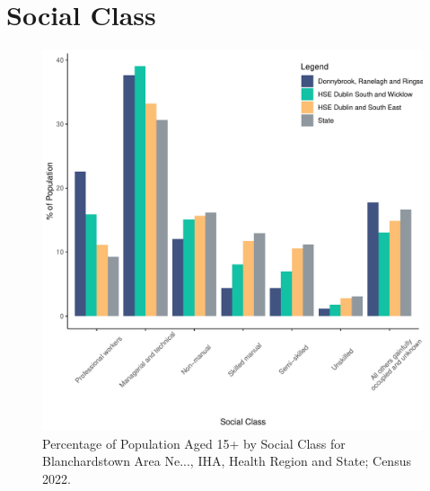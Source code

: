 \documentclass{article}
\begin{document}
\section{Social Class}\label{sect:SC}
\begin{figure}[H]
	\centering
	\includegraphics[width = 140mm]{../figures/SocialClassED.pdf}
	\caption{Percentage of Population Aged 15+ by Social Class for Blanchardstown Area Ne..., IHA, Health Region and State; Census 2022.}
	\label{fig:vbnv}
	\end{figure}
\end{document}
